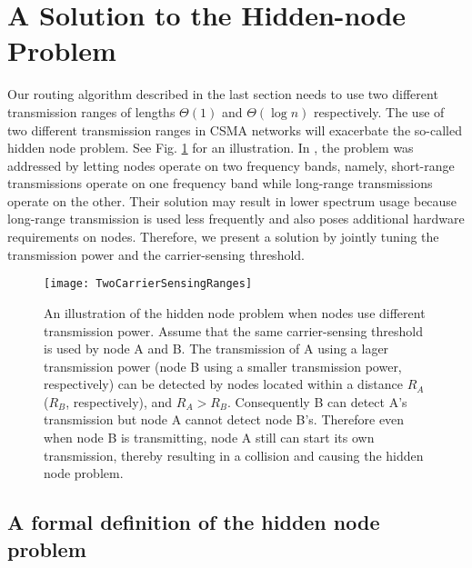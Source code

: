 \documentclass[english]{IEEEtran}
\theoremstyle{plain}
\theoremstyle{plain}
\theoremstyle{plain}
\theoremstyle{remark}
\begin{document}
\section{A Solution to the Hidden-node Problem\label{sec:Hidden-node-free-design}}

Our routing algorithm described in the last section needs to use two
different transmission ranges of lengths $\Theta\left(1\right)$ and
$\Theta\left(\log n\right)$ respectively. The use of two different
transmission ranges in CSMA networks will exacerbate the so-called
hidden node problem. See Fig. \ref{fig:Hidden node problem} for an
illustration. In \cite{Chau11Capacity}, the problem was addressed
by letting nodes operate on two frequency bands, namely, short-range
transmissions operate on one frequency band while long-range transmissions
operate on the other. Their solution may result in lower spectrum
usage because long-range transmission is used less frequently and
also poses additional hardware requirements on nodes. Therefore, we
present a solution by jointly tuning the transmission power and the
carrier-sensing threshold.

\begin{figure}
\begin{centering}
\texttt{[image: TwoCarrierSensingRanges]}
\par\end{centering}

\protect\caption{An illustration of the hidden node problem when nodes use different
transmission power. Assume that the same carrier-sensing threshold
is used by node A and B. The transmission of A using a lager transmission
power (node B using a smaller transmission power, respectively) can
be detected by nodes located within a distance $R_{A}$ ($R_{B}$,
respectively), and $R_{A}>R_{B}$. Consequently B can detect A's transmission
but node A cannot detect node B's. Therefore even when node B is transmitting,
node A still can start its own transmission, thereby resulting in
a collision and causing the hidden node problem. \label{fig:Hidden node problem}}
\end{figure}



\subsection{A formal definition of the hidden node problem}
\end{document}
